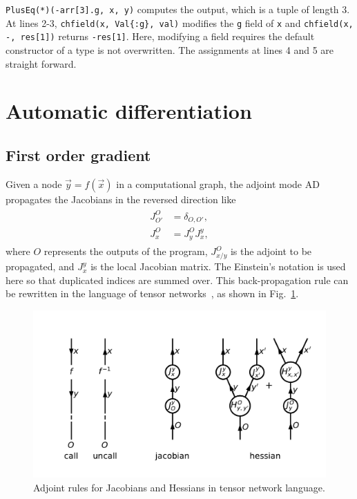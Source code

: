 \documentclass[aps,twocolumn,longbibliography,english,superscriptaddress]{revtex4-1}
\newcommand{\<}{\langle}
\renewcommand{\>}{\rangle}
\newcommand{\out}{{O}}
\newcommand{\Fig}[1]{Fig.~\ref{#1}}
\theoremstyle{definition}\newtheorem{definition}{\textit{Definition}}
\begin{document}
\texttt{PlusEq(*)(-arr[3].g, x, y)} computes the output, which is a tuple of length $3$.
At lines 2-3, \texttt{chfield(x, Val\{:g\}, val)} modifies the \texttt{g} field of \texttt{x} and \texttt{chfield(x, -, res[1])} returns \texttt{-res[1]}. Here, modifying a field requires the default constructor of a type is not overwritten.
The assignments at lines 4 and 5 are straight forward.

\section{Automatic differentiation}\label{sec:bp}

\subsection{First order gradient}\label{sec:jacobian}
Given a node $\vec y = f(\vec x)$ in a computational graph,
the adjoint mode AD propagates the Jacobians in the reversed direction like
\begin{align}
    \begin{split}
        J^{\out}_{\out'} &= \delta_{\out,\out'},\\
        J^{\out}_{x} &= J^{\out}_{y} J^{y}_{x},
    \end{split}
\end{align}
where $\out$ represents the outputs of the program, $J^{\out}_{x/y}$ is the adjoint to be propagated, and $J^{y}_x$ is the local Jacobian matrix. The Einstein's notation is used here so that duplicated indices are summed over.
This back-propagation rule can be rewritten in the language of tensor networks~\cite{Orus2014}, as shown in \Fig{fig:ad}.
\begin{figure}
    \centerline{\includegraphics[width=0.9\columnwidth,trim={0.5cm 1cm 0 1cm},clip]{images/ad.pdf}}
    \caption{Adjoint rules for Jacobians and Hessians in tensor network language.}\label{fig:ad}
\end{figure}
\end{document}
